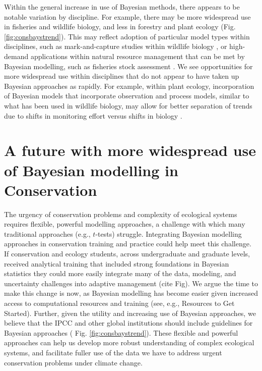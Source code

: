 \documentclass{article}
\begin{document}
\par Within the general increase in use of Bayesian methods, there appears to be notable variation by discipline. For example, there may be more widespread use in fisheries and wildlife biology, and less in forestry and plant ecology (Fig. \ref{fig:consbaystrend}). This may reflect adoption of particular model types within disciplines, such as mark-and-capture studies within wildlife biology \citep[e.g.,][]{royle2013spatial,calvert2009hierarchical}, or high-demand applications within natural resource management that can be met by Bayesian modelling, such as fisheries stock assessment \citep[e.g.,][]{punt1997fisheries}. We see opportunities for more widespread use within disciplines that do not appear to have  taken up Bayesian approaches as rapidly. For example, within plant ecology, incorporation of Bayesian models that incorporate observation and process models, similar to what has been used in wildlife biology, may allow for better separation of trends due to shifts in monitoring effort versus shifts in biology \citep[][]{pearse2017statistical}.


\section* {A future with more widespread use of Bayesian modelling in Conservation}
\par The urgency of conservation problems and complexity of  ecological systems requires flexible, powerful modelling approaches, a challenge with which many traditional approaches (e.g., $t$-tests) struggle. Integrating Bayesian modelling approaches in conservation training and practice could help meet this challenge. If conservation and ecology students, across undergraduate and graduate levels, received analytical training that included strong foundations in Bayesian statistics they could more easily integrate many of the data, modeling, and uncertainty challenges into adaptive management (cite Fig). We argue the time to make this change is now, as Bayesian modelling has become easier given increased access to computational resources and training (see, e.g., Resources to Get Started). Further, given the utility and increasing use of Bayesian approaches, we believe that the IPCC and other global institutions should include guidelines for Bayesian approaches ( Fig. \ref{fig:consbaystrend}). These flexible and powerful approaches can help us develop more robust understanding of complex ecological systems, and facilitate fuller use of the data we have to address urgent conservation problems under climate change.
\end{document}
